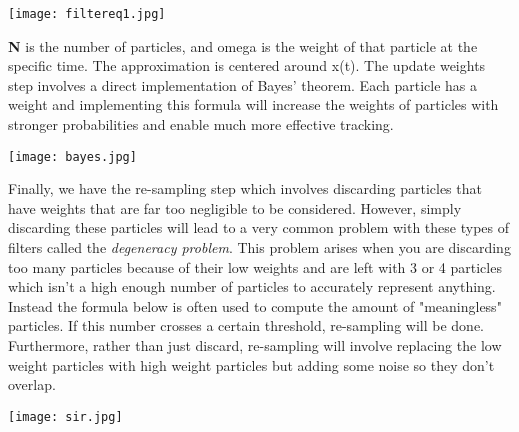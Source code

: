 \documentclass{llncs}
\begin{document}
\begin{wrapfigure}{}{}
  \begin{center}
    \texttt{[image: filtereq1.jpg]}
  \end{center}
\newline 
\indent \indent 
\textbf{N} is the number of particles, and omega is the weight of that particle at the specific time. The approximation is centered around x(t). The update weights step involves a direct implementation of Bayes' theorem. Each particle has a weight and implementing this formula will increase the weights of particles with stronger probabilities and enable much more effective tracking.
\begin{wrapfigure}{}{}
  \begin{center}
    \texttt{[image: bayes.jpg]}
  \end{center}
\end{wrapfigure}
\newline 
\pagebreak
\indent \indent Finally, we have the re-sampling step which involves discarding particles that have weights that are far too negligible to be considered. However, simply discarding these particles will lead to a very common problem with these types of filters called the \textit{degeneracy problem}. This problem arises when you are discarding too many particles because of their low weights and are left with 3 or 4 particles which isn't a high enough number of particles to accurately represent anything. Instead the formula below is often used to compute the amount of "meaningless" particles. If this number crosses a certain threshold, re-sampling will be done. Furthermore, rather than just discard, re-sampling will involve replacing the low weight particles with high weight particles but adding some noise so they don't overlap.
\end{wrapfigure}
\begin{wrapfigure}{}{}
  \begin{center}
    \texttt{[image: sir.jpg]}
  \end{center}
\end{wrapfigure}
\end{document}
